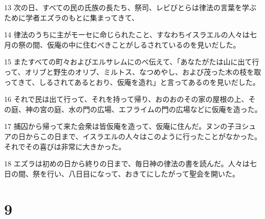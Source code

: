 \par 13 次の日、すべての民の氏族の長たち、祭司、レビびとらは律法の言葉を学ぶために学者エズラのもとに集まってきて、
\par 14 律法のうちに主がモーセに命じられたこと、すなわちイスラエルの人々は七月の祭の間、仮庵の中に住むべきことがしるされているのを見いだした。
\par 15 またすべての町々およびエルサレムにのべ伝えて、「あなたがたは山に出て行って、オリブと野生のオリブ、ミルトス、なつめやし、および茂った木の枝を取ってきて、しるされてあるとおり、仮庵を造れ」と言ってあるのを見いだした。
\par 16 それで民は出て行って、それを持って帰り、おのおのその家の屋根の上、その庭、神の宮の庭、水の門の広場、エフライムの門の広場などに仮庵を造った。
\par 17 捕囚から帰って来た会衆は皆仮庵を造って、仮庵に住んだ。ヌンの子ヨシュアの日からこの日まで、イスラエルの人々はこのように行ったことがなかった。それでその喜びは非常に大きかった。
\par 18 エズラは初めの日から終りの日まで、毎日神の律法の書を読んだ。人々は七日の間、祭を行い、八日目になって、おきてにしたがって聖会を開いた。

\chapter{9}

